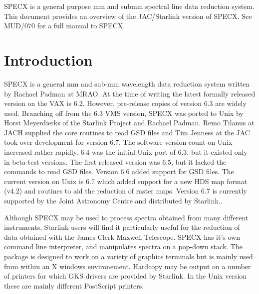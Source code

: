 \documentclass[twoside,11pt]{article}
\newcommand{\stardocinitials}  {SUN}
\newcommand{\stardocnumber}    {17.7}
\newcommand{\stardocabstract}  {SPECX is a general purpose mm and submm
spectral line data reduction system. This document provides an overview
of the JAC/Starlink version of SPECX. See MUD/070 for a full manual to
SPECX.}
\newcommand{\stardocname}{\stardocinitials /\stardocnumber}
\newcommand{\htmladdnormallink}[2]{#1}
\newenvironment{latexonly}{}{}
\newcommand{\xref}[3]{#1}
\renewcommand{\_}{\texttt{\symbol{95}}}
\renewcommand{\thepage}{\roman{page}}
\begin{document}
\stardocabstract
  \newpage
  \begin{latexonly}
    \setlength{\parskip}{0mm}
    \tableofcontents
    \setlength{\parskip}{\medskipamount}
    \markboth{\stardocname}{\stardocname}
  \end{latexonly}
\cleardoublepage
\renewcommand{\thepage}{\arabic{page}}
\setcounter{page}{1}

\section {Introduction}

SPECX is a general mm and sub-mm wavelength data reduction system written by
Rachael Padman at \htmladdnormallink{MRAO}{http://www.mrao.cam.ac.uk}. At the
time of writing the latest formally released version on the VAX is
6.2. However, pre-release copies of version 6.3 are widely used. Branching off
from the 6.3 VMS version, SPECX was ported to Unix by Horst Meyerdierks of the
\htmladdnormallink{Starlink Project}{http://www.starlink.rl.ac.uk} and Rachael
Padman. Remo Tilanus at JACH supplied the core routines to read GSD files and
Tim Jenness at the JAC took over development for version 6.7. The software
version count on Unix increased rather rapidly. 6.4 was the initial Unix port
of 6.3, but it existed only in beta-test versions. The first released version
was 6.5, but it lacked the commands to read GSD files.  Version 6.6 added
support for GSD files. The current version on Unix is 6.7 which added support
for a new \xref{HDS}{sun92}{} map format (v4.2) and routines to aid the
reduction of raster maps. Version 6.7 is currently supported by the Joint
Astronomy Centre and distributed by Starlink..

Although SPECX may be used to process spectra obtained from many different
instruments, Starlink users will find it particularly useful for the reduction
of data obtained with the James Clerk Maxwell Telescope.  SPECX has it's own
command line interpreter, and manipulates spectra on a pop-down stack.  The
package is designed to work on a variety of graphics terminals but is mainly
used from within an X windows environement. Hardcopy may be output on a number
of printers for which \xref{GKS}{sun83}{} drivers are provided by Starlink. In
the Unix version these are mainly different PostScript printers.
\end{document}
